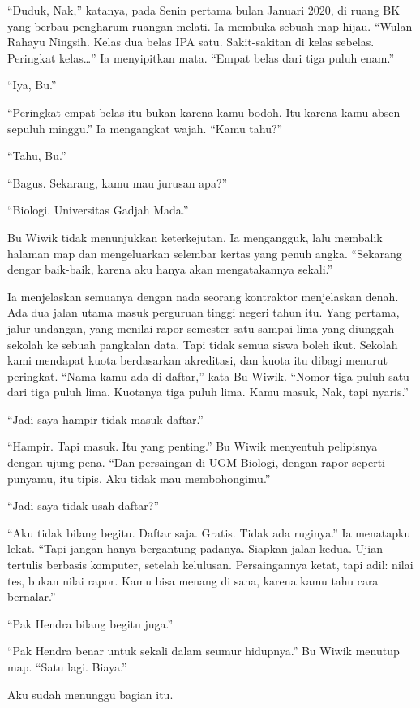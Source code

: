 \documentclass[11pt,twoside,openany]{book}
\begin{document}
``Duduk, Nak,'' katanya, pada Senin pertama bulan Januari 2020, di ruang BK yang berbau pengharum ruangan melati. Ia membuka sebuah map hijau. ``Wulan Rahayu Ningsih. Kelas dua belas IPA satu. Sakit-sakitan di kelas sebelas. Peringkat kelas\ldots{}'' Ia menyipitkan mata. ``Empat belas dari tiga puluh enam.''

``Iya, Bu.''

``Peringkat empat belas itu bukan karena kamu bodoh. Itu karena kamu absen sepuluh minggu.'' Ia mengangkat wajah. ``Kamu tahu?''

``Tahu, Bu.''

``Bagus. Sekarang, kamu mau jurusan apa?''

``Biologi. Universitas Gadjah Mada.''

Bu Wiwik tidak menunjukkan keterkejutan. Ia mengangguk, lalu membalik halaman map dan mengeluarkan selembar kertas yang penuh angka. ``Sekarang dengar baik-baik, karena aku hanya akan mengatakannya sekali.''

Ia menjelaskan semuanya dengan nada seorang kontraktor menjelaskan denah. Ada dua jalan utama masuk perguruan tinggi negeri tahun itu. Yang pertama, jalur undangan, yang menilai rapor semester satu sampai lima yang diunggah sekolah ke sebuah pangkalan data. Tapi tidak semua siswa boleh ikut. Sekolah kami mendapat kuota berdasarkan akreditasi, dan kuota itu dibagi menurut peringkat. ``Nama kamu ada di daftar,'' kata Bu Wiwik. ``Nomor tiga puluh satu dari tiga puluh lima. Kuotanya tiga puluh lima. Kamu masuk, Nak, tapi nyaris.''

``Jadi saya hampir tidak masuk daftar.''

``Hampir. Tapi masuk. Itu yang penting.'' Bu Wiwik menyentuh pelipisnya dengan ujung pena. ``Dan persaingan di UGM Biologi, dengan rapor seperti punyamu, itu tipis. Aku tidak mau membohongimu.''

``Jadi saya tidak usah daftar?''

``Aku tidak bilang begitu. Daftar saja. Gratis. Tidak ada ruginya.'' Ia menatapku lekat. ``Tapi jangan hanya bergantung padanya. Siapkan jalan kedua. Ujian tertulis berbasis komputer, setelah kelulusan. Persaingannya ketat, tapi adil: nilai tes, bukan nilai rapor. Kamu bisa menang di sana, karena kamu tahu cara bernalar.''

``Pak Hendra bilang begitu juga.''

``Pak Hendra benar untuk sekali dalam seumur hidupnya.'' Bu Wiwik menutup map. ``Satu lagi. Biaya.''

Aku sudah menunggu bagian itu.
\end{document}
